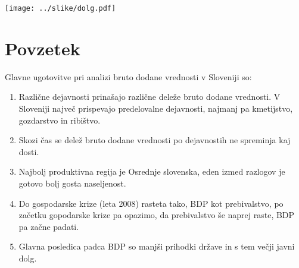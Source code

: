 \documentclass[a4paper, 11pt]{article}
\begin{document}
\begin{center}
\texttt{[image: ../slike/dolg.pdf]}
\end{center}


\newpage
\section{Povzetek}
Glavne ugotovitve pri analizi bruto dodane vrednosti v Sloveniji so:
\begin{enumerate}
\item Različne dejavnosti prinašajo različne deleže bruto dodane vrednosti. V Sloveniji največ prispevajo predelovalne dejavnosti, najmanj pa kmetijstvo, gozdarstvo in ribištvo.
\item Skozi čas se delež bruto dodane vrednosti po dejavnostih ne spreminja kaj dosti.
\item Najbolj produktivna regija je Osrednje slovenska, eden izmed razlogov je gotovo bolj gosta naseljenost.
\item Do gospodarske krize (leta 2008) rasteta tako, BDP kot prebivalstvo, po začetku gopodarske krize pa opazimo, da prebivalstvo še naprej raste, BDP pa začne padati.
\item Glavna posledica padca BDP so manjši prihodki države in s tem večji javni dolg.
\end{enumerate}
\end{document}
